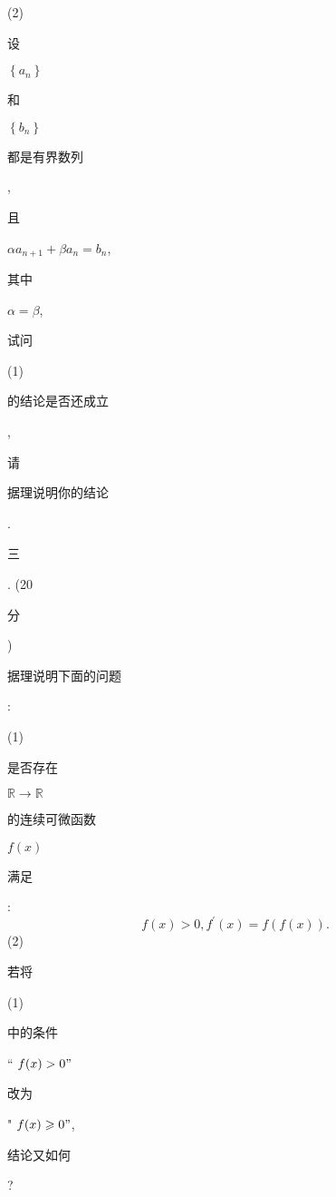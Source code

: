 \documentclass[10pt]{article}
\begin{document}
(2) \begin{CJK}{UTF8}{mj}设\end{CJK} $\left\{a_{n}\right\}$ \begin{CJK}{UTF8}{mj}和\end{CJK} $\left\{b_{n}\right\}$ \begin{CJK}{UTF8}{mj}都是有界数列\end{CJK}, \begin{CJK}{UTF8}{mj}且\end{CJK} $\alpha a_{n+1}+\beta a_{n}=b_{n}$, \begin{CJK}{UTF8}{mj}其中\end{CJK} $\alpha=\beta$, \begin{CJK}{UTF8}{mj}试问\end{CJK} (1) \begin{CJK}{UTF8}{mj}的结论是否还成立\end{CJK}, \begin{CJK}{UTF8}{mj}请\end{CJK} \begin{CJK}{UTF8}{mj}据理说明你的结论\end{CJK}.

\begin{CJK}{UTF8}{mj}三\end{CJK}. (20 \begin{CJK}{UTF8}{mj}分\end{CJK}) \begin{CJK}{UTF8}{mj}据理说明下面的问题\end{CJK}:

(1) \begin{CJK}{UTF8}{mj}是否存在\end{CJK} $\mathbb{R} \rightarrow \mathbb{R}$ \begin{CJK}{UTF8}{mj}的连续可微函数\end{CJK} $f(x)$ \begin{CJK}{UTF8}{mj}满足\end{CJK}:
$$
f(x)>0, f^{\prime}(x)=f(f(x)) .
$$
(2) \begin{CJK}{UTF8}{mj}若将\end{CJK} (1) \begin{CJK}{UTF8}{mj}中的条件\end{CJK} “ $f(x)>0 "$ \begin{CJK}{UTF8}{mj}改为\end{CJK} " $f(x) \geqslant 0 "$, \begin{CJK}{UTF8}{mj}结论又如何\end{CJK}?
\end{document}
